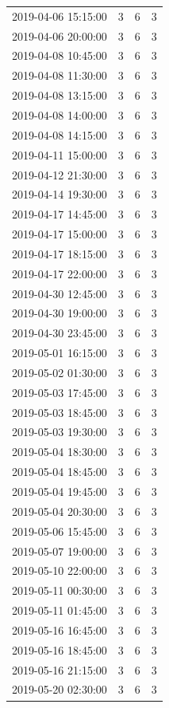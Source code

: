 \begin{tabular}{lrrr}
2019-04-06 15:15:00 & 3 & 6 & 3 \\
2019-04-06 20:00:00 & 3 & 6 & 3 \\
2019-04-08 10:45:00 & 3 & 6 & 3 \\
2019-04-08 11:30:00 & 3 & 6 & 3 \\
2019-04-08 13:15:00 & 3 & 6 & 3 \\
2019-04-08 14:00:00 & 3 & 6 & 3 \\
2019-04-08 14:15:00 & 3 & 6 & 3 \\
2019-04-11 15:00:00 & 3 & 6 & 3 \\
2019-04-12 21:30:00 & 3 & 6 & 3 \\
2019-04-14 19:30:00 & 3 & 6 & 3 \\
2019-04-17 14:45:00 & 3 & 6 & 3 \\
2019-04-17 15:00:00 & 3 & 6 & 3 \\
2019-04-17 18:15:00 & 3 & 6 & 3 \\
2019-04-17 22:00:00 & 3 & 6 & 3 \\
2019-04-30 12:45:00 & 3 & 6 & 3 \\
2019-04-30 19:00:00 & 3 & 6 & 3 \\
2019-04-30 23:45:00 & 3 & 6 & 3 \\
2019-05-01 16:15:00 & 3 & 6 & 3 \\
2019-05-02 01:30:00 & 3 & 6 & 3 \\
2019-05-03 17:45:00 & 3 & 6 & 3 \\
2019-05-03 18:45:00 & 3 & 6 & 3 \\
2019-05-03 19:30:00 & 3 & 6 & 3 \\
2019-05-04 18:30:00 & 3 & 6 & 3 \\
2019-05-04 18:45:00 & 3 & 6 & 3 \\
2019-05-04 19:45:00 & 3 & 6 & 3 \\
2019-05-04 20:30:00 & 3 & 6 & 3 \\
2019-05-06 15:45:00 & 3 & 6 & 3 \\
2019-05-07 19:00:00 & 3 & 6 & 3 \\
2019-05-10 22:00:00 & 3 & 6 & 3 \\
2019-05-11 00:30:00 & 3 & 6 & 3 \\
2019-05-11 01:45:00 & 3 & 6 & 3 \\
2019-05-16 16:45:00 & 3 & 6 & 3 \\
2019-05-16 18:45:00 & 3 & 6 & 3 \\
2019-05-16 21:15:00 & 3 & 6 & 3 \\
2019-05-20 02:30:00 & 3 & 6 & 3 \\

\end{tabular}
